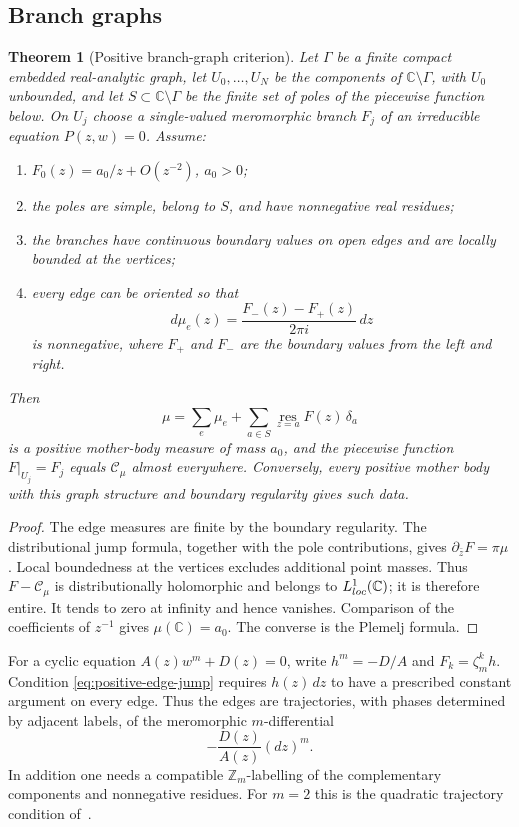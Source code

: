 \documentclass[10pt,a4paper]{amsart}
\newtheorem{theorem}{Theorem}[section]
\newcommand{\bC}{\mathbb C}
\newcommand{\Cauchy}{\mathcal C}
\begin{document}
\subsection{Branch graphs}

\begin{theorem}[Positive branch-graph criterion]\label{thm:branch-graph}
Let $\Gamma$ be a finite compact embedded real-analytic graph, let
$U_0,\ldots,U_N$ be the components of $\bC\setminus\Gamma$, with $U_0$
unbounded, and let $S\subset\bC\setminus\Gamma$ be the finite set of poles of
the piecewise function below.  On $U_j$ choose a single-valued meromorphic
branch $F_j$ of an irreducible equation
$P(z,w)=0$.  Assume:
\begin{enumerate}[label=\textup{(\roman*)}]
\item $F_0(z)=a_0/z+O(z^{-2})$, $a_0>0$;
\item the poles are simple, belong to $S$, and have nonnegative real residues;
\item the branches have continuous boundary values on open edges and are
locally bounded at the vertices;
\item every edge can be oriented so that
\begin{equation}\label{eq:positive-edge-jump}
 d\mu_e(z)=\frac{F_-(z)-F_+(z)}{2\pi i}\,dz
\end{equation}
is nonnegative, where $F_+$ and $F_-$ are the boundary values from the left and
right.
\end{enumerate}
Then
\[
 \mu=\sum_e\mu_e+
 \sum_{a\in S}\operatorname*{res}_{z=a}F(z)\,\delta_a
\]
is a positive mother-body measure of mass $a_0$, and the piecewise function
$F|_{U_j}=F_j$ equals $\Cauchy_\mu$ almost everywhere.  Conversely, every
positive mother body with this graph structure and boundary regularity gives
such data.
\end{theorem}

\begin{proof}
The edge measures are finite by the boundary regularity.  The distributional
jump formula, together with the pole contributions, gives
$\partial_{\bar z}F=\pi\mu$.  Local boundedness at the vertices excludes
additional point masses.  Thus $F-\Cauchy_\mu$ is distributionally holomorphic
and belongs to $L^1_{\rm loc}(\bC)$; it is therefore entire.  It tends to zero at
infinity and hence vanishes.  Comparison of the coefficients of $z^{-1}$ gives
$\mu(\bC)=a_0$.  The converse is the Plemelj formula.
\end{proof}

For a cyclic equation $A(z)w^m+D(z)=0$, write $h^m=-D/A$ and
$F_k=\zeta_m^kh$.  Condition \eqref{eq:positive-edge-jump} requires
$h(z)\,dz$ to have a prescribed constant argument on every edge.  Thus the
edges are trajectories, with phases determined by adjacent labels, of the
meromorphic $m$-differential
\[
 -\frac{D(z)}{A(z)}(dz)^m.
\]
In addition one needs a compatible $\mathbb Z_m$-labelling of the complementary
components and nonnegative residues.  For $m=2$ this is the quadratic
trajectory condition of~\cite{BoSh}.
\end{document}
